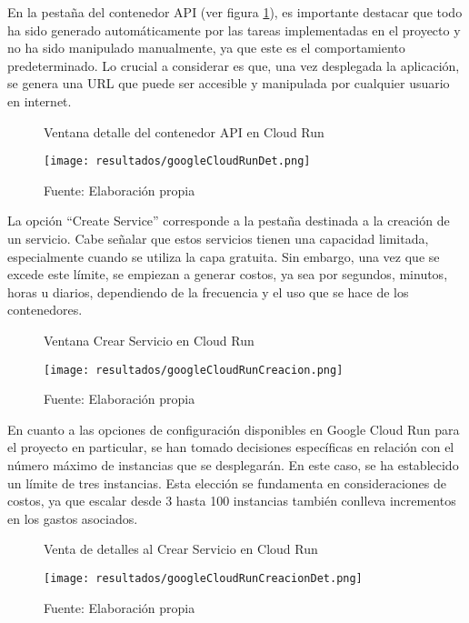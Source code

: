 En la pestaña del contenedor API (ver figura \ref{fig:figuraGoogleCloudRunDet}), es importante destacar que todo ha sido generado automáticamente por las tareas implementadas en el proyecto y no ha sido manipulado manualmente, ya que este es el comportamiento predeterminado. Lo crucial a considerar es que, una vez desplegada la aplicación, se genera una URL que puede ser accesible y manipulada por cualquier usuario en internet.

\newpage

\begin{figure}[h]
	\centering
	\caption{Ventana detalle del contenedor API en Cloud Run}
	\texttt{[image: resultados/googleCloudRunDet.png]}
	\caption*{\footnotesize Fuente: Elaboración propia}
	\label{fig:figuraGoogleCloudRunDet}
\end{figure}

La opción ``Create Service'' corresponde a la pestaña destinada a la creación de un servicio. Cabe señalar que estos servicios tienen una capacidad limitada, especialmente cuando se utiliza la capa gratuita. Sin embargo, una vez que se excede este límite, se empiezan a generar costos, ya sea por segundos, minutos, horas u diarios, dependiendo de la frecuencia y el uso que se hace de los contenedores.

\newpage

\begin{figure}[h]
	\centering
	\caption{Ventana Crear Servicio en Cloud Run}
	\texttt{[image: resultados/googleCloudRunCreacion.png]}
	\caption*{\footnotesize Fuente: Elaboración propia}
	\label{fig:figuraGoogleCloudRunCreacion}
\end{figure}

En cuanto a las opciones de configuración disponibles en Google Cloud Run para el proyecto en particular, se han tomado decisiones específicas en relación con el número máximo de instancias que se desplegarán. En este caso, se ha establecido un límite de tres instancias. Esta elección se fundamenta en consideraciones de costos, ya que escalar desde 3 hasta 100 instancias también conlleva incrementos en los gastos asociados.

\newpage

\begin{figure}[h]
	\centering
	\caption{Venta de detalles al Crear Servicio en Cloud Run}
	\texttt{[image: resultados/googleCloudRunCreacionDet.png]}
	\caption*{\footnotesize Fuente: Elaboración propia}
	\label{fig:figuraGoogleCloudRunCreacionDet}
\end{figure}



